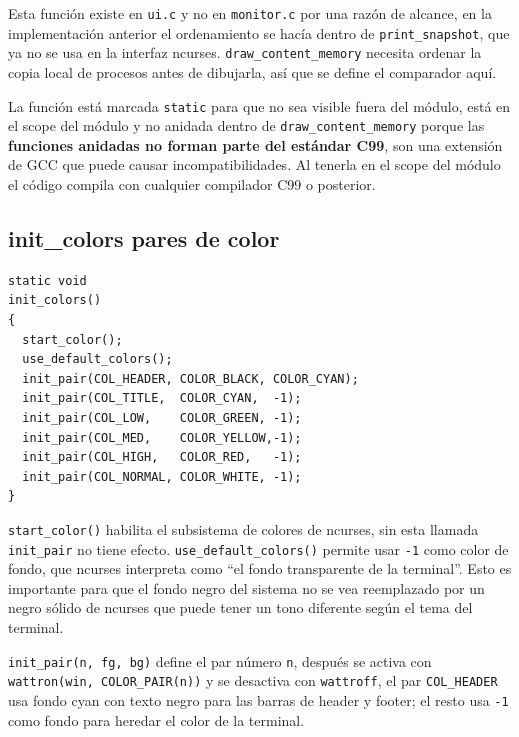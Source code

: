 \documentclass[12pt,letterpaper]{article}
\begin{document}
Esta función existe en \texttt{ui.c} y no en \texttt{monitor.c} por una razón de alcance, en la implementación
anterior el ordenamiento se hacía dentro de \texttt{print\_snapshot}, que ya no se usa en la interfaz ncurses.
\texttt{draw\_content\_memory} necesita ordenar la copia local de procesos antes de dibujarla, así que se define
el comparador aquí.

\medskip

La función está marcada \texttt{static} para que no sea visible fuera del módulo, está en el scope del módulo y
no anidada dentro de \texttt{draw\_content\_memory} porque las
\textbf{funciones anidadas no forman parte del estándar C99}, son una extensión de GCC que puede causar
incompatibilidades. Al tenerla en el scope del módulo el código compila con cualquier compilador C99 o posterior.

\subsection*{init\_colors pares de color}

\begin{lstlisting}[style=modernc, caption={\texttt{ui.c} init\_colors()}]
static void
init_colors()
{
  start_color();
  use_default_colors();
  init_pair(COL_HEADER, COLOR_BLACK, COLOR_CYAN);
  init_pair(COL_TITLE,  COLOR_CYAN,  -1);
  init_pair(COL_LOW,    COLOR_GREEN, -1);
  init_pair(COL_MED,    COLOR_YELLOW,-1);
  init_pair(COL_HIGH,   COLOR_RED,   -1);
  init_pair(COL_NORMAL, COLOR_WHITE, -1);
}
\end{lstlisting}

\texttt{start\_color()} habilita el subsistema de colores de ncurses, sin esta llamada \texttt{init\_pair} no
tiene efecto. \texttt{use\_default\_colors()} permite usar \texttt{-1} como color de fondo, que ncurses
interpreta como ``el fondo transparente de la terminal''. Esto es importante para que el fondo negro del sistema
no se vea reemplazado por un negro sólido de ncurses que puede tener un tono diferente según el tema del
terminal.

\medskip

\texttt{init\_pair(n, fg, bg)} define el par número \texttt{n}, después se activa con
\texttt{wattron(win, COLOR\_PAIR(n))} y se desactiva con \texttt{wattroff}, el par \texttt{COL\_HEADER}
usa fondo cyan con texto negro para las barras de header y footer; el resto usa \texttt{-1} como fondo para
heredar el color de la terminal.
\end{document}
